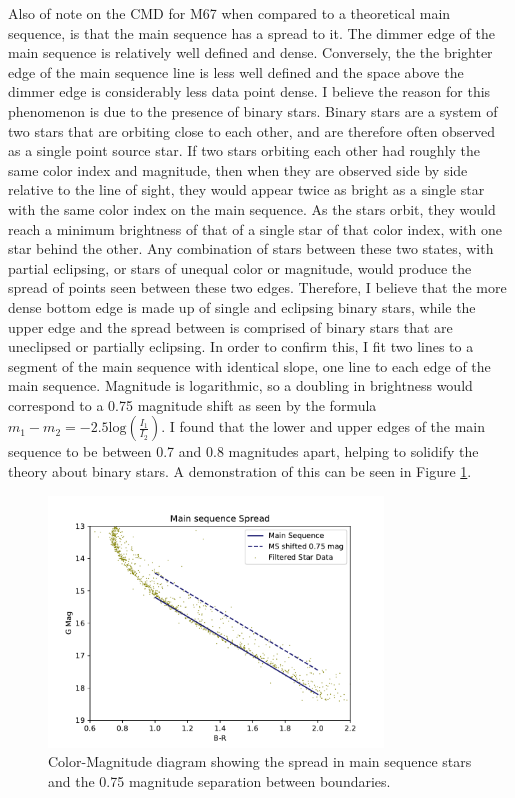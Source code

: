 \documentclass[aps,prb,twocolumn,groupedaddress,nofootinbib,floatfix]{revtex4-1}
\begin{document}
Also of note on the CMD for M67 when compared to a theoretical main sequence, is that the main sequence has a spread to it. The dimmer edge of the main sequence is relatively well defined and dense. Conversely, the the brighter edge of the main sequence line is less well defined and the space above the dimmer edge is considerably less data point dense. I believe the reason for this phenomenon is due to the presence of binary stars. Binary stars are a system of two stars that are orbiting close to each other, and are therefore often observed as a single point source star. If two stars orbiting each other had roughly the same color index and magnitude, then when they are observed side by side relative to the line of sight, they would appear twice as bright as a single star with the same color index on the main sequence. As the stars orbit, they would reach a minimum brightness of that of a single star of that color index, with one star behind the other. Any combination of stars between these two states, with partial eclipsing, or stars of unequal color or magnitude, would produce the spread of points seen between these two edges. Therefore, I believe that the more dense bottom edge is made up of single and eclipsing binary stars, while the upper edge and the spread between is comprised of binary stars that are uneclipsed or partially eclipsing. In order to confirm this, I fit two lines to a segment of the main sequence with identical slope, one line to each edge of the main sequence. Magnitude is logarithmic, so a doubling in brightness would correspond to a 0.75 magnitude shift as seen by the formula $m_1-m_2 = -2.5\text{log}\left(\frac{I_1}{I_2}\right)$. I found that the lower and upper edges of the main sequence to be between 0.7 and 0.8 magnitudes apart, helping to solidify the theory about binary stars. A demonstration of this can be seen in Figure \ref{fig:MS_spread}.


\begin{figure}[!h]
	\centering
      \includegraphics[width=3.5in]{M67_MS_Spread.pdf}
	\caption{Color-Magnitude diagram showing the spread in main sequence stars and the 0.75 magnitude separation between boundaries.}
	\label{fig:MS_spread}
\end{figure}
\end{document}
